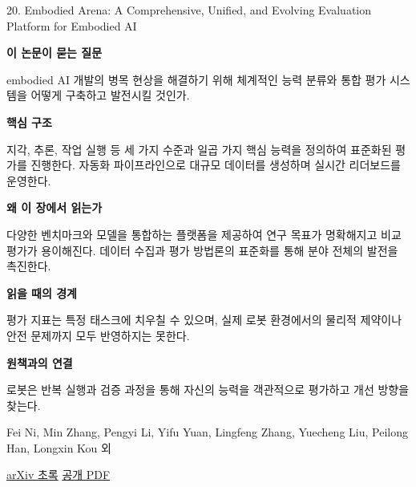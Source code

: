 \documentclass[11pt,openany]{book}
\begin{document}
\begin{termcard}{20. Embodied Arena: A Comprehensive, Unified, and Evolving Evaluation Platform for Embodied AI}

\par

\medskip

{\sffamily\bfseries\color{deepblue} 이 논문이 묻는 질문}\par

embodied AI 개발의 병목 현상을 해결하기 위해 체계적인 능력 분류와 통합 평가 시스템을 어떻게 구축하고 발전시킬 것인가.

\smallskip

{\sffamily\bfseries\color{deepblue} 핵심 구조}\par

지각, 추론, 작업 실행 등 세 가지 수준과 일곱 가지 핵심 능력을 정의하여 표준화된 평가를 진행한다. 자동화 파이프라인으로 대규모 데이터를 생성하며 실시간 리더보드를 운영한다.

\smallskip

{\sffamily\bfseries\color{deepblue} 왜 이 장에서 읽는가}\par

다양한 벤치마크와 모델을 통합하는 플랫폼을 제공하여 연구 목표가 명확해지고 비교 평가가 용이해진다. 데이터 수집과 평가 방법론의 표준화를 통해 분야 전체의 발전을 촉진한다.

\smallskip

{\sffamily\bfseries\color{coral} 읽을 때의 경계}\par

평가 지표는 특정 태스크에 치우칠 수 있으며, 실제 로봇 환경에서의 물리적 제약이나 안전 문제까지 모두 반영하지는 못한다.

\smallskip

{\sffamily\bfseries\color{teal} 원책과의 연결}\par

로봇은 반복 실행과 검증 과정을 통해 자신의 능력을 객관적으로 평가하고 개선 방향을 찾는다.

\medskip

{\footnotesize\color{muted} Fei Ni, Min Zhang, Pengyi Li, Yifu Yuan, Lingfeng Zhang, Yuecheng Liu, Peilong Han, Longxin Kou 외\par

\href{https://arxiv.org/abs/2509.15273}{arXiv 초록} \quad \href{https://arxiv.org/pdf/2509.15273}{공개 PDF}\par}

\end{termcard}
\end{document}
